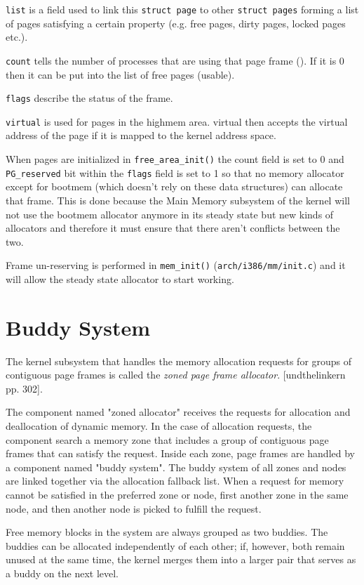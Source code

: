 \documentclass[twoside]{article}
\begin{document}
\texttt{list} is a field used to link this \texttt{struct page} to other
\texttt{struct pages} forming a list of pages satisfying a certain property
(e.g. free pages, dirty pages, locked pages etc.).

\texttt{count} tells the number of processes that are using that page frame (). If
it is 0 then it can be put into the list of free pages (usable).

\texttt{flags} describe the status of the frame. 

\texttt{virtual} is used for pages in the highmem area.
virtual then accepts the virtual address of the page if it is mapped to the
kernel address space.

When pages are initialized in \texttt{free_area_init()} the count field is set
to 0 and \texttt{PG_reserved} bit within the \texttt{flags} field is set to 1
so that no memory allocator except for bootmem (which doesn't rely on these data
structures) can allocate that frame. This is done because the Main Memory
subsystem of the kernel will not use the bootmem allocator anymore in its steady
state but new kinds of allocators and therefore it must ensure that there aren't
conflicts between the two.

Frame un-reserving is performed in \texttt{mem_init()}
(\texttt{arch/i386/mm/init.c}) and it will allow the steady state allocator to
start working.

\section{Buddy System}
The kernel subsystem that handles the memory allocation requests for groups of
contiguous page frames is called the \textit{zoned page frame allocator}.
[undthelinkern pp. 302].

The component named "zoned allocator" receives the requests for allocation and
deallocation of dynamic memory. In the case of allocation requests, the
component search a memory zone that includes a group of contiguous page frames
that can satisfy the request. Inside each zone, page frames are handled by a
component named "buddy system". The buddy system of all zones and nodes are
linked together via the allocation fallback list. When a request for memory
cannot be satisfied in the preferred zone or node, first another zone in the
same node, and then another node is picked to fulfill the request.

Free memory blocks in the system are always grouped as two buddies. The buddies can be
allocated independently of each other; if, however, both remain unused at the
same time, the kernel merges them into a larger pair that serves as a buddy on
the next level.
\end{document}
